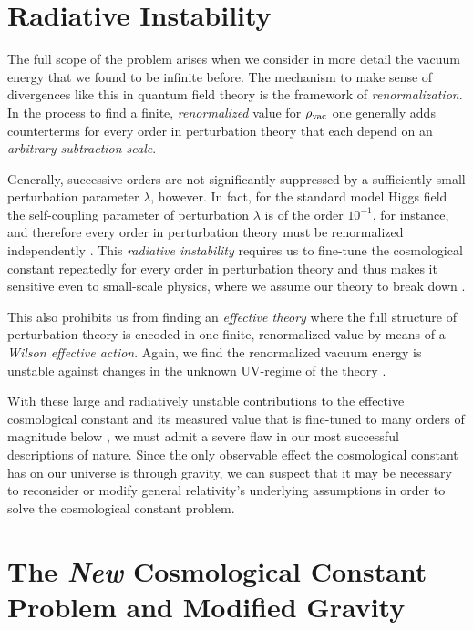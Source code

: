 \section{Radiative Instability}\label{sec:rad_instability}

The full scope of the problem arises when we consider in more detail the vacuum energy that we found to be infinite before. The mechanism to make sense of divergences like this in quantum field theory is the framework of \emph{renormalization}. In the process to find a finite, \emph{renormalized} value for \(\rho_\textnormal{vac}\) one generally adds counterterms for every order in perturbation theory that each depend on an \emph{arbitrary subtraction scale}.

Generally, successive orders are not significantly suppressed by a sufficiently small perturbation parameter \(\lambda\), however. In fact, for the standard model Higgs field the self-coupling parameter of perturbation \(\lambda\) is of the order \(10^{-1}\), for instance, and therefore every order in perturbation theory must be renormalized independently \autocite{Padilla2015}. This \emph{radiative instability} requires us to fine-tune the cosmological constant repeatedly for every order in perturbation theory and thus makes it sensitive even to small-scale physics, where we assume our theory to break down \autocite{Padilla2015}.

This also prohibits us from finding an \emph{effective theory} where the full structure of perturbation theory is encoded in one finite, renormalized value by means of a \emph{Wilson effective action}. Again, we find the renormalized vacuum energy is unstable against changes in the unknown UV-regime of the theory  \autocite{Padilla2015}.

With these large and radiatively unstable contributions to the effective cosmological constant and its measured value that is fine-tuned to many orders of magnitude below \autocite{Martin2012}, we must admit a severe flaw in our most successful descriptions of nature. Since the only observable effect the cosmological constant has on our universe is through gravity, we can suspect that it may be necessary to reconsider or modify general relativity's underlying assumptions in order to solve the cosmological constant problem.

\section{The \emph{New} Cosmological Constant Problem and Modified Gravity}\label{ch:cc_problem_new}

